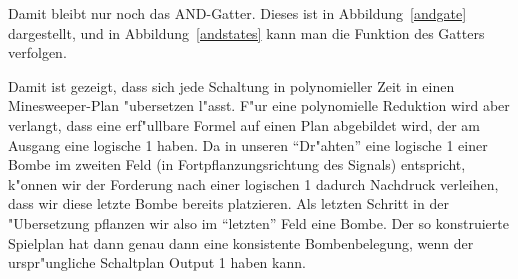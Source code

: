 Damit bleibt nur noch das AND-Gatter. Dieses ist in Abbildung~\ref{andgate}
dargestellt, und in Abbildung~\ref{andstates} kann man die Funktion des
Gatters verfolgen.

Damit ist gezeigt, dass sich jede Schaltung in polynomieller Zeit in 
einen Minesweeper-Plan "ubersetzen l"asst. F"ur eine polynomielle
Reduktion wird aber verlangt, dass eine erf"ullbare Formel auf einen
Plan abgebildet wird, der am Ausgang eine logische 1 haben.
Da in unseren ``Dr"ahten'' eine logische 1 einer Bombe im zweiten
Feld (in Fortpflanzungsrichtung des Signals) entspricht, k"onnen
wir der Forderung nach einer logischen 1 dadurch Nachdruck verleihen,
dass wir diese letzte Bombe bereits platzieren. Als letzten Schritt
in der "Ubersetzung pflanzen wir also im ``letzten'' Feld eine Bombe.
Der so konstruierte Spielplan hat dann genau dann eine konsistente
Bombenbelegung, wenn der urspr"ungliche Schaltplan Output 1 haben kann.

